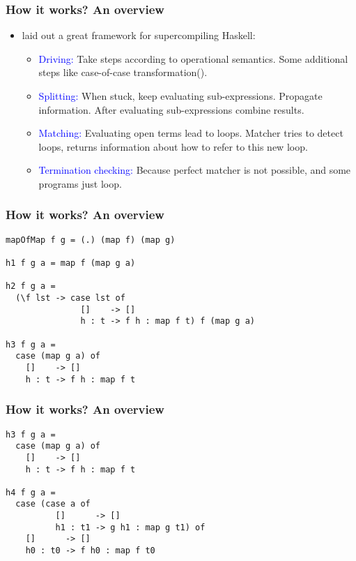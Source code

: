 \documentclass{beamer}
\begin{document}
\begin{frame}
    \frametitle{How it works? An overview}

    \begin{itemize}
        \item[]
            \citet{callbyneed-sc} laid out a great framework for
            supercompiling Haskell:
            \begin{itemize}[<+->]
                \item
                    \textcolor{blue}{Driving:} Take steps according to operational
                    semantics.  Some additional steps like case-of-case
                    transformation(\citet{Jones98atransformation-based}).
                \item
                    \textcolor{blue}{Splitting:} When stuck, keep evaluating
                    sub-expressions. Propagate information. After evaluating
                    sub-expressions combine results.
                \item
                    \textcolor{blue}{Matching:} Evaluating open terms lead to loops.
                    Matcher tries to detect loops, returns information about how
                    to refer to this new loop.
                \item
                    \textcolor{blue}{Termination checking:} Because perfect matcher is
                    not possible, and some programs just loop.
            \end{itemize}
    \end{itemize}
\end{frame}

{
    
}

\begin{frame}[fragile]
    \frametitle{How it works? An overview}
    \begin{verbatim}
mapOfMap f g = (.) (map f) (map g)

h1 f g a = map f (map g a)

h2 f g a =
  (\f lst -> case lst of
               []    -> []
               h : t -> f h : map f t) f (map g a)

h3 f g a =
  case (map g a) of
    []    -> []
    h : t -> f h : map f t
    \end{verbatim}
\end{frame}

\begin{frame}[fragile]
    \frametitle{How it works? An overview}
    \begin{verbatim}
h3 f g a =
  case (map g a) of
    []    -> []
    h : t -> f h : map f t

h4 f g a =
  case (case a of
          []      -> []
          h1 : t1 -> g h1 : map g t1) of
    []      -> []
    h0 : t0 -> f h0 : map f t0
    \end{verbatim}
\end{frame}
\end{document}
